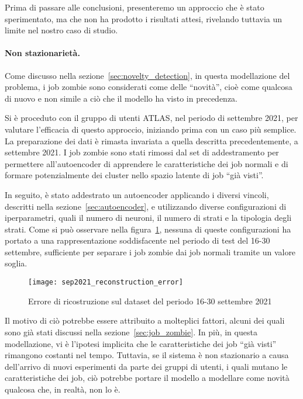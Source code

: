Prima di passare alle conclusioni, presenteremo un approccio che è stato
sperimentato, ma che non ha prodotto i risultati attesi, rivelando tuttavia un
limite nel nostro caso di studio.

\paragraph{Non stazionarietà.} Come discusso nella
sezione~\ref{sec:novelty_detection}, in questa modellazione del problema, i
job zombie sono considerati come delle ``novità'', cioè come qualcosa di nuovo
e non simile a ciò che il modello ha visto in precedenza. 

Si è proceduto con il gruppo di utenti ATLAS, nel periodo di settembre 2021,
per valutare l'efficacia di questo approccio, iniziando prima con un caso più
semplice. La preparazione dei dati è rimasta invariata a quella descritta
precedentemente, a settembre 2021. I job zombie sono stati rimossi dal set di
addestramento per permettere all'autoencoder di apprendere le caratteristiche
dei job normali e di formare potenzialmente dei cluster nello spazio latente
di job ``già visti''. 

In seguito, è stato addestrato un autoencoder applicando i diversi vincoli,
descritti nella sezione~\ref{sec:autoencoder}, e utilizzando diverse
configurazioni di iperparametri, quali il numero di neuroni, il numero di
strati e la tipologia degli strati. Come si può osservare nella
figura~\ref{fig:sep2021_reconstruction_error}, nessuna di queste
configurazioni ha portato a una rappresentazione soddisfacente nel periodo di
test del 16-30 settembre, sufficiente per separare i job zombie dai job
normali tramite un valore soglia.

\begin{figure}[!ht]
    \centering 
    \texttt{[image: sep2021\_reconstruction\_error]}
    \caption{Errore di ricostruzione sul dataset del periodo 16-30 settembre
    2021}
    \label{fig:sep2021_reconstruction_error}
\end{figure}

Il motivo di ciò potrebbe essere attribuito a molteplici fattori, alcuni dei
quali sono già stati discussi nella sezione~\ref{sec:job_zombie}. In più, in
questa modellazione, vi è l'ipotesi implicita che le caratteristiche dei job
``già visti'' rimangono costanti nel tempo. Tuttavia, se il sistema è non
stazionario a causa dell'arrivo di nuovi esperimenti da parte dei gruppi di
utenti, i quali mutano le caratteristiche dei job, ciò potrebbe portare il
modello a modellare come novità qualcosa che, in realtà, non lo è.

